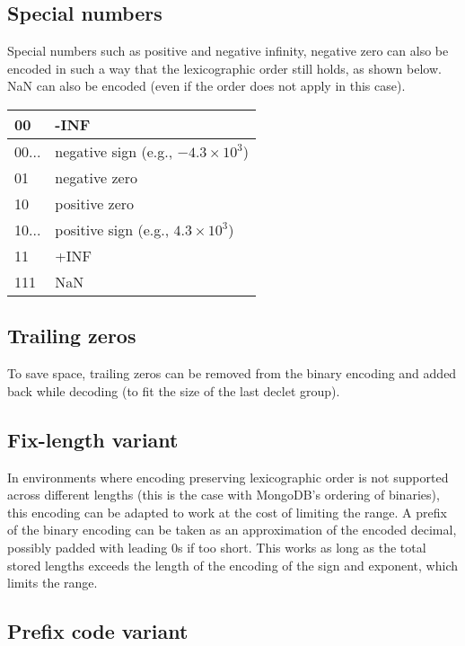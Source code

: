 \documentclass[final,leqno,onefignum,onetabnum]{siamltex1213}
\begin{document}
\subsection{Special numbers}

Special numbers such as positive and negative infinity, negative zero can also be encoded in such a way that the lexicographic order still holds, as shown below. NaN can also be encoded (even if the order does not apply in this case).

\begin{tabular}{|l|l|}
\hline
00 & -INF \\
\hline
00... &  negative sign (e.g., $-4.3\times10^3$)\\
\hline
01 & negative zero \\
\hline
10 & positive zero \\
\hline
10... & positive sign (e.g., $4.3\times10^3$)\\
\hline
11 & +INF \\
\hline
111 & NaN \\
\hline
\end{tabular}


\subsection{Trailing zeros}
\label{section-trailing-zeros}

To save space, trailing zeros can be removed from the binary encoding and added back while decoding (to fit the size of the last declet group).

\subsection{Fix-length variant}

In environments where encoding preserving lexicographic order is not supported across different lengths (this is the case with MongoDB's ordering of binaries), this encoding can be adapted to work at the cost of limiting the range.
A prefix of the binary encoding can be taken as an approximation of the encoded decimal, possibly padded with leading 0s if too short. This works as long as the total stored lengths exceeds the length of the encoding of the sign and exponent, which limits the range.

\subsection{Prefix code variant}
\label{section-prefix-code}
\end{document}
